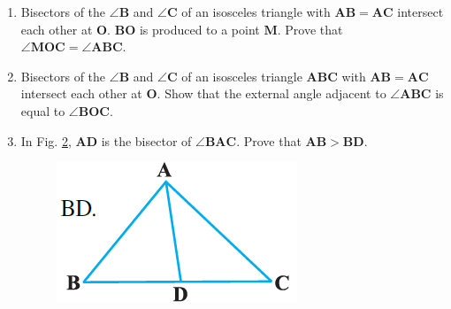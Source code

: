 \documentclass{article}
\let\vec\mathbf
\begin{document}
\begin{enumerate}
\begin{figure}[h]
	\caption{}
	\label{fig:7.3.8}
\end{figure}
\item Bisectors of the $\angle \vec{B}$ and $\angle \vec{C}$ of an isosceles triangle with $\vec{AB=AC}$ intersect each other at $\vec{O}$. $\vec{BO}$ is produced to a point $\vec{M}$. Prove that $\angle \vec{MOC}= \angle \vec{ABC}$.
\item Bisectors of the $\angle \vec{B}$ and $\angle \vec{C}$ of an isosceles triangle $\vec{ABC}$ with $\vec{AB=AC}$ intersect each other at $\vec{O}$. Show that the external angle adjacent to $\angle \vec{ABC}$ is equal to $\angle \vec{BOC}$.
\item In Fig. \ref{fig:7.3.11}, $\vec{AD}$ is the bisector of $\angle \vec{BAC}$. Prove that $\vec{AB>BD}$.
\begin{figure}[h]
	\centering
	\includegraphics[width=\columnwidth]{figs/Figure5.png}
	\caption{}
	\label{fig:7.3.11}
\end{figure}
\end{enumerate}
\end{document}

